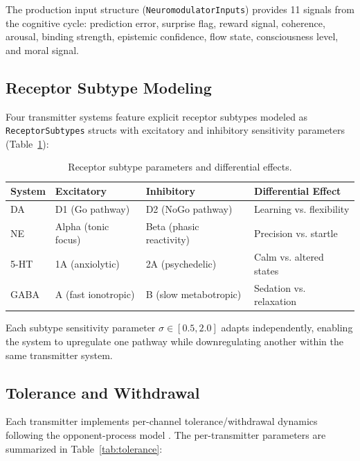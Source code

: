 \documentclass[11pt,a4paper]{article}
\begin{document}
The production input structure (\texttt{NeuromodulatorInputs}) provides 11 signals from the cognitive cycle: prediction error, surprise flag, reward signal, coherence, arousal, binding strength, epistemic confidence, flow state, consciousness level, and moral signal.

\subsection{Receptor Subtype Modeling}

Four transmitter systems feature explicit receptor subtypes modeled as \texttt{ReceptorSubtypes} structs with excitatory and inhibitory sensitivity parameters (Table~\ref{tab:receptors}):

\begin{table}[h]
\centering
\caption{Receptor subtype parameters and differential effects.}
\label{tab:receptors}
\begin{tabular}{llll}
\toprule
\textbf{System} & \textbf{Excitatory} & \textbf{Inhibitory} & \textbf{Differential Effect} \\
\midrule
DA & D1 (Go pathway) & D2 (NoGo pathway) & Learning vs. flexibility \\
NE & Alpha (tonic focus) & Beta (phasic reactivity) & Precision vs. startle \\
5-HT & 1A (anxiolytic) & 2A (psychedelic) & Calm vs. altered states \\
GABA & A (fast ionotropic) & B (slow metabotropic) & Sedation vs. relaxation \\
\bottomrule
\end{tabular}
\end{table}

Each subtype sensitivity parameter $\sigma \in [0.5, 2.0]$ adapts independently, enabling the system to upregulate one pathway while downregulating another within the same transmitter system.

\subsection{Tolerance and Withdrawal}

Each transmitter implements per-channel tolerance/withdrawal dynamics following the opponent-process model \citep{koob2001}. The per-transmitter parameters are summarized in Table~\ref{tab:tolerance}:
\end{document}
